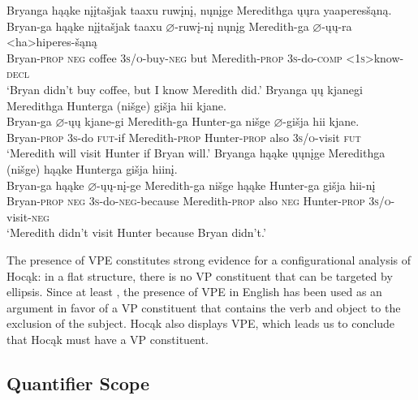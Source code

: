 \documentclass[output=paper]{LSP/langsci}
\begin{document}
\begin{exe}
\ex
\begin{xlist}
\ex 
\glll Bryanga	h\k{a}\k{a}ke	{n\k{i}\k{i}ta\v{s}jak taaxu}		ruw\k{i}n\k{i},		n\k{u}n\k{i}ge		Meredithga \k{u}\k{u}ra 	yaaperes\v{s}\k{a}n\k{a}. \\
Bryan-ga h\k{a}\k{a}ke	{n\k{i}\k{i}ta\v{s}jak taaxu} $\varnothing$-ruw\k{i}-n\k{i} n\k{u}n\k{i}g	Meredith-ga $\varnothing$-\k{u}\k{u}-ra	<ha>hiperes-\v{s}\k{a}n\k{a} \\
Bryan-\textsc{prop}	\textsc{neg}	coffee	 \textsc{3s/o}-buy-\textsc{neg} but	 Meredith-\textsc{prop} \textsc{3s}-do-\textsc{comp}	\textsc{<1s>}know-\textsc{decl} \\
\trans `Bryan didn't buy coffee, but I know Meredith did.'
\ex 
\glll Bryanga	\k{u}\k{u}	kjanegi	Meredithga	Hunterga	(ni\v{s}ge)	 {gi\v{s}ja hii} kjane.\\
Bryan-ga	$\varnothing$-\k{u}\k{u}  kjane-gi	 Meredith-ga	Hunter-ga	ni\v{s}ge  {$\varnothing$-gi\v{s}ja hii} kjane. \\
Bryan-\textsc{prop} \textsc{3s}-do	\textsc{fut}-if	 Meredith-\textsc{prop} Hunter-\textsc{prop}	 also	 \textsc{3s/o}-visit	 \textsc{fut} \\
\trans `Meredith will visit Hunter if Bryan will.'
\ex 
\glll Bryanga			h\k{a}\k{a}ke	\k{u}\k{u}n\k{i}ge	Meredithga		(ni\v{s}ge)		h\k{a}\k{a}ke Hunterga	{gi\v{s}ja hiin\k{i}.}\\
Bryan-ga	h\k{a}\k{a}ke	$\varnothing$-\k{u}\k{u}-n\k{i}-ge	Meredith-ga	 ni\v{s}ge	h\k{a}\k{a}ke  Hunter-ga  {gi\v{s}ja hii-n\k{i}} \\
Bryan-\textsc{prop}	\textsc{neg}	\textsc{3s}-do-\textsc{neg}-because Meredith-\textsc{prop} also	\textsc{neg} Hunter-\textsc{prop} \textsc{3s/o}-visit-\textsc{neg} \\
\trans `Meredith didn't visit Hunter because Bryan didn't.'
\end{xlist}
\end{exe}

The presence of VPE constitutes strong evidence for a configurational analysis of Hoc\k{a}k: in a flat structure, there is no VP constituent that can be targeted by ellipsis. Since at least \citet{Ross1969}, the presence of VPE in English has been used as an argument in favor of a VP constituent that contains the verb and object to the exclusion of the subject. Hoc\k{a}k also displays VPE, which leads us to conclude that Hoc\k{a}k must have a VP constituent.

\subsection{Quantifier Scope}
\end{document}
